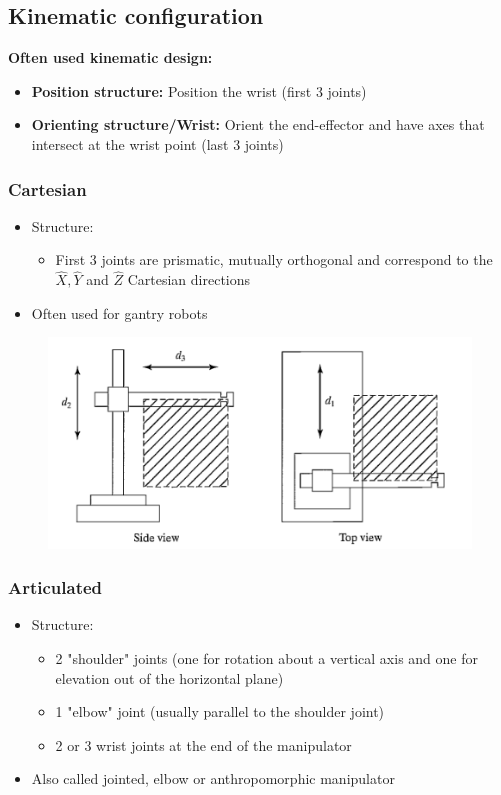 \documentclass[10pt,a4paper]{article}
\begin{document}
\subsection{Kinematic configuration}
\textbf{Often used kinematic design:}
\begin{itemize}
	\item \textbf{Position structure:} Position the wrist (first 3 joints)
	\item \textbf{Orienting structure/Wrist:} Orient the end-effector and have axes that intersect at the wrist point (last 3 joints)
\end{itemize}

\subsubsection{Cartesian}
\begin{itemize}
	\item Structure:	
	\begin{itemize}
		\item First 3 joints are prismatic, mutually orthogonal and correspond to the $\hat{X}, \hat{Y}$ and $\hat{Z}$ Cartesian directions
	\end{itemize}
	\item Often used for gantry robots
\end{itemize}

\begin{figure}[H]
	\includegraphics[width=0.5\columnwidth]{imgs/man_cartesian.png}
\end{figure}

\subsubsection{Articulated}
\begin{itemize}
	\item Structure:	
	\begin{itemize}
		\item 2 "shoulder" joints (one for rotation about a vertical axis and one for elevation out of the horizontal plane)
		\item 1 "elbow" joint (usually parallel to the shoulder joint)
		\item 2 or 3 wrist joints at the end of the manipulator
	\end{itemize}
	\item Also called jointed, elbow or anthropomorphic manipulator
\end{itemize}
\end{document}
